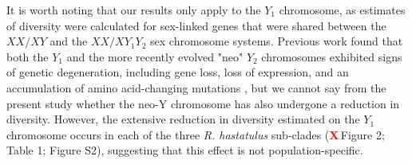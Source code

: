 \documentclass[9pt,twocolumn,twoside]{gsajnl}
\newcommand{\X}{\textcolor{red}{\bf X\,}}
\begin{document}







It is worth noting that our results only apply to the $Y_{1}$ chromosome, as estimates of diversity were calculated for sex-linked genes that were shared between the $XX/XY$ and the $XX/XY_{1}Y_{2}$ sex chromosome systems. Previous work found that both the $Y_{1}$ and the more recently evolved "neo" $Y_{2}$ chromosomes exhibited signs of genetic degeneration, including gene loss, loss of expression, and an accumulation of amino acid-changing mutations \citep{hough2014}, but we cannot say from the present study whether the neo-Y chromosome has also undergone a reduction in diversity. However, the extensive reduction in diversity estimated on the $Y_{1}$ chromosome occurs in each of the three \textit{R. hastatulus} sub-clades (\X Figure 2; Table 1; Figure S2), suggesting that this effect is not population-specific.
\end{document}
